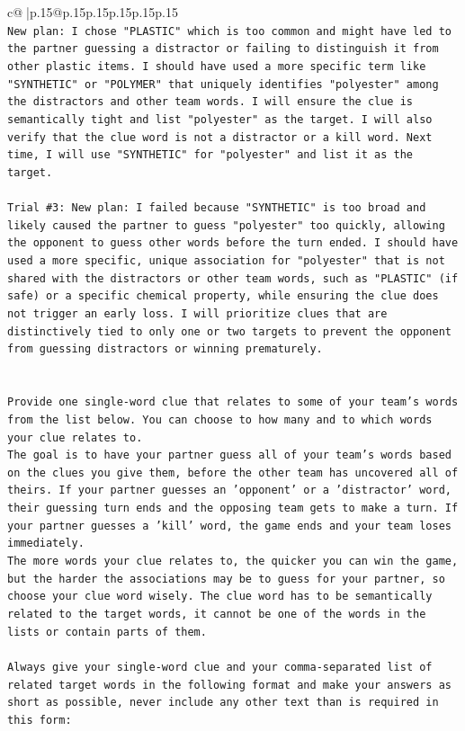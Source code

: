 \documentclass{article}
\begin{document}
{\begin{supertabular}{c@{$\;$}|p{.15\linewidth}@{}p{.15\linewidth}p{.15\linewidth}p{.15\linewidth}p{.15\linewidth}p{.15\linewidth}}
{{{\\ 
\texttt{New plan: I chose "PLASTIC" which is too common and might have led to the partner guessing a distractor or failing to distinguish it from other plastic items. I should have used a more specific term like "SYNTHETIC" or "POLYMER" that uniquely identifies "polyester" among the distractors and other team words. I will ensure the clue is semantically tight and list "polyester" as the target. I will also verify that the clue word is not a distractor or a kill word. Next time, I will use "SYNTHETIC" for "polyester" and list it as the target.} \\
\\ 
\texttt{Trial \#3: New plan: I failed because "SYNTHETIC" is too broad and likely caused the partner to guess "polyester" too quickly, allowing the opponent to guess other words before the turn ended. I should have used a more specific, unique association for "polyester" that is not shared with the distractors or other team words, such as "PLASTIC" (if safe) or a specific chemical property, while ensuring the clue does not trigger an early loss. I will prioritize clues that are distinctively tied to only one or two targets to prevent the opponent from guessing distractors or winning prematurely.} \\
\\ 
\\ 
\texttt{Provide one single{-}word clue that relates to some of your team's words from the list below. You can choose to how many and to which words your clue relates to.} \\
\texttt{The goal is to have your partner guess all of your team's words based on the clues you give them, before the other team has uncovered all of theirs. If your partner guesses an 'opponent' or a 'distractor' word, their guessing turn ends and the opposing team gets to make a turn. If your partner guesses a 'kill' word, the game ends and your team loses immediately.} \\
\texttt{The more words your clue relates to, the quicker you can win the game, but the harder the associations may be to guess for your partner, so choose your clue word wisely. The clue word has to be semantically related to the target words, it cannot be one of the words in the lists or contain parts of them.} \\
\\ 
\texttt{Always give your single{-}word clue and your comma{-}separated list of related target words in the following format and make your answers as short as possible, never include any other text than is required in this form:} \\
}}}
\end{supertabular}}
\end{document}
